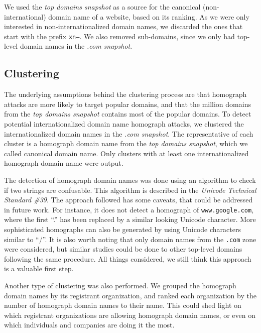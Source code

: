 \documentclass[letterpaper,twocolumn,10pt]{article}
\begin{document}
We used the \textit{top domains snapshot} as a source for the canonical (non-international) domain name of a website, based on its ranking.
As we were only interested in non-internationalized domain names, we discarded the ones that start with the prefix \texttt{xn--}.
We also removed sub-domains, since we only had top-level domain names in the \textit{.com snapshot}.

\subsection{Clustering}
The underlying assumptions behind the clustering process are that homograph attacks are more likely to target popular domains, and that the million domains from the \textit{top domains snapshot} contains most of the popular domains.
To detect potential internationalized domain name homograph attacks, we clustered the internationalized domain names in the \textit{.com snapshot}.
The representative of each cluster is a homograph domain name from the \textit{top domains snapshot}, which we called canonical domain name.
Only clusters with at least one internationalized homograph domain name were output.

The detection of homograph domain names was done using an algorithm to check if two strings are confusable.
This algorithm is described in the \textit{Unicode Technical Standard \#39}.
The approach followed has some caveats, that could be addressed in future work.
For instance, it does not detect a homograph of \texttt{www.google.com}, where the first ``.'' has been replaced by a similar looking Unicode character.
More sophisticated homographs can also be generated by using Unicode characters similar to ``/''.
It is also worth noting that only domain names from the \texttt{.com} zone were considered, but similar studies could be done to other top-level domains following the same procedure.
All things considered, we still think this approach is a valuable first step.

Another type of clustering was also performed.
We grouped the homograph domain names by its registrant organization, and ranked each organization by the number of homograph domain names to their name.
This could shed light on which registrant organizations are allowing homograph domain names, or even on which individuals and companies are doing it the most.
\end{document}
